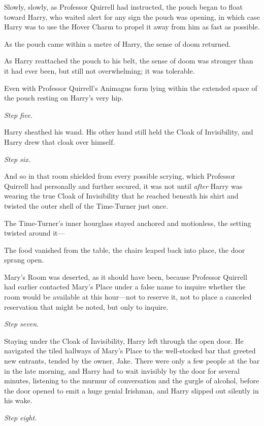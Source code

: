Slowly, slowly, as Professor Quirrell had instructed, the pouch began to float
toward Harry, who waited alert for any sign the pouch was opening, in which
case Harry was to use the Hover Charm to propel it away from him as fast as
possible.

As the pouch came within a metre of Harry, the sense of doom returned.

As Harry reattached the pouch to his belt, the sense of doom was stronger than
it had ever been, but still not overwhelming; it was tolerable.

Even with Professor Quirrell's Animagus form lying within the extended space of
the pouch resting on Harry's very hip.

\emph{Step five.}

Harry sheathed his wand. His other hand still held the Cloak of Invisibility,
and Harry drew that cloak over himself.

\emph{Step six.}

And so in that room shielded from every possible scrying, which Professor
Quirrell had personally and further secured, it was not until \emph{after}
Harry was wearing the true Cloak of Invisibility that he reached beneath his
shirt and twisted the outer shell of the Time-Turner just once.

The Time-Turner's inner hourglass stayed anchored and motionless, the setting
twisted around it---

The food vanished from the table, the chairs leaped back into place, the door
sprang open.

Mary's Room was deserted, as it should have been, because Professor Quirrell
had earlier contacted Mary's Place under a false name to inquire whether the
room would be available at this hour---not to reserve it, not to place a
canceled reservation that might be noted, but only to inquire.

\emph{Step seven.}

Staying under the Cloak of Invisibility, Harry left through the open door. He
navigated the tiled hallways of Mary's Place to the well-stocked bar that
greeted new entrants, tended by the owner, Jake. There were only a few people
at the bar in the late morning, and Harry had to wait
invisibly by the door for several minutes, listening to the murmur of
conversation and the gurgle of alcohol, before the door opened to emit a huge
genial Irishman, and Harry slipped out silently in his wake.

\emph{Step eight.}

